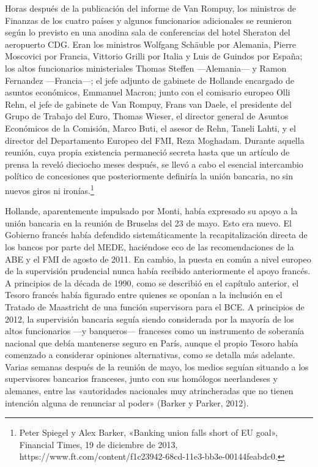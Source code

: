 \documentclass[10pt,a4paper]{article}
\begin{document}
{Horas después de la publicación del informe de Van Rompuy, los ministros de Finanzas de los cuatro países y algunos funcionarios adicionales se reunieron según lo previsto en una anodina sala de conferencias del hotel Sheraton del aeropuerto CDG. Eran los ministros Wolfgang Schäuble por Alemania, Pierre Moscovici por Francia, Vittorio Grilli por Italia y Luis de Guindos por España; los altos funcionarios ministeriales Thomas Steffen —Alemania— y Ramon Fernandez —Francia—; el jefe adjunto de gabinete de Hollande encargado de asuntos económicos, Emmanuel Macron; junto con el comisario europeo Olli Rehn, el jefe de gabinete de Van Rompuy, Frans van Daele, el presidente del Grupo de Trabajo del Euro, Thomas Wieser, el director general de Asuntos Económicos de la Comisión, Marco Buti, el asesor de Rehn, Taneli Lahti, y el director del Departamento Europeo del FMI, Reza Moghadam. Durante aquella reunión, cuya propia existencia permaneció secreta hasta que un artículo de prensa la reveló dieciocho meses después, se llevó a cabo el esencial intercambio político de concesiones que posteriormente definiría la unión bancaria, no sin nuevos giros ni ironías.\footnote{%
    Peter Spiegel y Alex Barker, «Banking union falls short of EU goal», Financial Times, 19 de diciembre de 2013, https://www.ft.com/content/f1c23942-68cd-11e3-bb3e-00144feabdc0.
}

Hollande, aparentemente impulsado por Monti, había expresado su apoyo a la unión bancaria en la reunión de Bruselas del 23 de mayo. Esto era nuevo. El Gobierno francés había defendido sistemáticamente la recapitalización directa de los bancos por parte del MEDE, haciéndose eco de las recomendaciones de la ABE y el FMI de agosto de 2011. En cambio, la puesta en común a nivel europeo de la supervisión prudencial nunca había recibido anteriormente el apoyo francés. A principios de la década de 1990, como se describió en el capítulo anterior, el Tesoro francés había figurado entre quienes se oponían a la inclusión en el Tratado de Maastricht de una función supervisora para el BCE. A principios de 2012, la supervisión bancaria seguía siendo considerada por la mayoría de los altos funcionarios —y banqueros— franceses como un instrumento de soberanía nacional que debía mantenerse seguro en París, aunque el propio Tesoro había comenzado a considerar opiniones alternativas, como se detalla más adelante. Varias semanas después de la reunión de mayo, los medios seguían situando a los supervisores bancarios franceses, junto con sus homólogos neerlandeses y alemanes, entre las «autoridades nacionales muy atrincheradas que no tienen intención alguna de renunciar al poder» (Barker y Parker, 2012).

}
\end{document}
